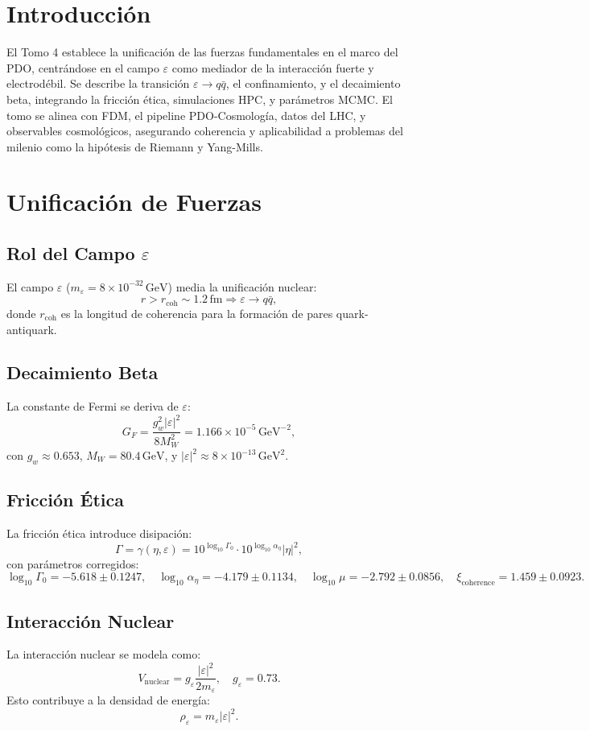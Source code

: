 \documentclass[a4paper,12pt]{article}
\newcommand{\eps}{\varepsilon}
\newcommand{\etaa}{\eta}
\newcommand{\gev}{\text{GeV}}
\begin{document}
\section{Introducción}
El Tomo 4 establece la unificación de las fuerzas fundamentales en el marco del PDO, centrándose en el campo \(\eps\) como mediador de la interacción fuerte y electrodébil. Se describe la transición \(\eps \to q \bar{q}\), el confinamiento, y el decaimiento beta, integrando la fricción ética, simulaciones HPC, y parámetros MCMC. El tomo se alinea con FDM, el pipeline PDO-Cosmología, datos del LHC, y observables cosmológicos, asegurando coherencia y aplicabilidad a problemas del milenio como la hipótesis de Riemann y Yang-Mills.

\section{Unificación de Fuerzas}
\subsection{Rol del Campo \(\eps\)}
El campo \(\eps\) (\(m_\eps = 8 \times 10^{-32} \, \gev\)) media la unificación nuclear:
\[
r > r_{\text{coh}} \sim 1.2 \, \text{fm} \Rightarrow \eps \to q \bar{q},
\]
donde \(r_{\text{coh}}\) es la longitud de coherencia para la formación de pares quark-antiquark.

\subsection{Decaimiento Beta}
La constante de Fermi se deriva de \(\eps\):
\[
G_F = \frac{g_w^2 |\eps|^2}{8M_W^2} = 1.166 \times 10^{-5} \, \gev^{-2},
\]
con \(g_w \approx 0.653\), \(M_W = 80.4 \, \gev\), y \(|\eps|^2 \approx 8 \times 10^{-13} \, \gev^2\).

\subsection{Fricción Ética}
La fricción ética introduce disipación:
\[
\Gamma = \gamma(\etaa, \eps) = 10^{\log_{10} \Gamma_0} \cdot 10^{\log_{10} \alpha_\eta} |\etaa|^2,
\]
con parámetros corregidos:
\[
\log_{10} \Gamma_0 = -5.618 \pm 0.1247, \quad \log_{10} \alpha_\eta = -4.179 \pm 0.1134, \quad \log_{10} \mu = -2.792 \pm 0.0856, \quad \xi_{\text{coherence}} = 1.459 \pm 0.0923.
\]

\subsection{Interacción Nuclear}
La interacción nuclear se modela como:
\[
V_{\text{nuclear}} = g_\eps \frac{|\eps|^2}{2 m_\eps}, \quad g_\eps = 0.73.
\]
Esto contribuye a la densidad de energía:
\[
\rho_\eps = m_\eps |\eps|^2.
\]
\end{document}
